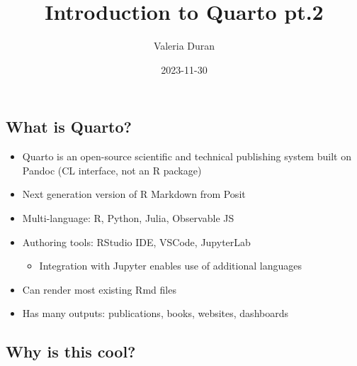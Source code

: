 \documentclass[
  letterpaper,
  DIV=11,
  numbers=noendperiod]{scrartcl}
\title{Introduction to Quarto pt.2}
\author{Valeria Duran}
\date{2023-11-30}
\providecommand{\tightlist}{%
  \setlength{\itemsep}{0pt}\setlength{\parskip}{0pt}}\usepackage{longtable,booktabs,array}
\begin{document}
\maketitle
\ifdefined\Shaded\renewenvironment{Shaded}{\begin{tcolorbox}[boxrule=0pt, breakable, sharp corners, interior hidden, enhanced, frame hidden, borderline west={3pt}{0pt}{shadecolor}]}{\end{tcolorbox}}\fi

\hypertarget{section}{%
\subsection{}\label{section}}

\hypertarget{what-is-quarto}{%
\subsection{What is Quarto?}\label{what-is-quarto}}

\begin{itemize}
\tightlist
\item
  Quarto is an open-source scientific and technical publishing system
  built on Pandoc {(CL interface, not an R package)}
\item
  Next generation version of R Markdown from Posit
\item
  Multi-language: R, Python, Julia, Observable JS
\item
  Authoring tools: RStudio IDE, VSCode, JupyterLab

  \begin{itemize}
  \tightlist
  \item
    Integration with Jupyter enables use of additional languages
  \end{itemize}
\item
  Can render most existing Rmd files
\item
  Has many outputs: publications, books, websites, dashboards
\end{itemize}

\hypertarget{why-is-this-cool}{%
\subsection{Why is this cool?}\label{why-is-this-cool}}
\end{document}

